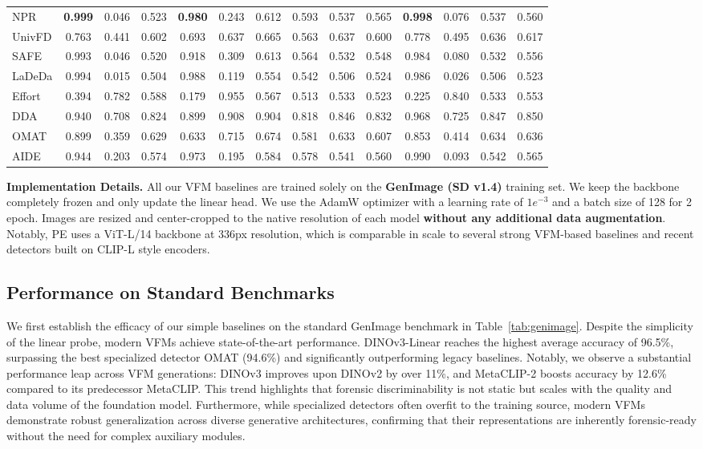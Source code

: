\documentclass[sigconf,screen]{acmart}
\theoremstyle{plain}
\theoremstyle{definition}
\theoremstyle{remark}
\begin{document}
\begin{table}[ht]
{\begin{tabular}{l|ccc|ccc|ccc|ccc|c}
NPR & \textbf{0.999} & 0.046 & 0.523 & \textbf{0.980} & 0.243 & 0.612 & 0.593 & 0.537 & 0.565 & \textbf{0.998} & 0.076 & 0.537 & 0.560 \\
UnivFD & 0.763 & 0.441 & 0.602 & 0.693 & 0.637 & 0.665 & 0.563 & 0.637 & 0.600 & 0.778 & 0.495 & 0.636 & 0.617 \\
SAFE & 0.993 & 0.046 & 0.520 & 0.918 & 0.309 & 0.613 & 0.564 & 0.532 & 0.548 & 0.984 & 0.080 & 0.532 & 0.556 \\
LaDeDa & 0.994 & 0.015 & 0.504 & 0.988 & 0.119 & 0.554 & 0.542 & 0.506 & 0.524 & 0.986 & 0.026 & 0.506 & 0.523 \\
Effort & 0.394 & 0.782 & 0.588 & 0.179 & 0.955 & 0.567 & 0.513 & 0.533 & 0.523 & 0.225 & 0.840 & 0.533 & 0.553 \\
DDA & 0.940 & 0.708 & 0.824 & 0.899 & 0.908 & 0.904 & 0.818 & 0.846 & 0.832 & 0.968 & 0.725 & 0.847 & 0.850 \\
OMAT & 0.899 & 0.359 & 0.629 & 0.633 & 0.715 & 0.674 & 0.581 & 0.633 & 0.607 & 0.853 & 0.414 & 0.634 & 0.636 \\
AIDE & 0.944 & 0.203 & 0.574 & 0.973 & 0.195 & 0.584 & 0.578 & 0.541 & 0.560 & 0.990 & 0.093 & 0.542 & 0.565 \\
\bottomrule
\end{tabular}
}
\label{tab:inthewild}
\end{table}

\textbf{Implementation Details.} 
All our VFM baselines are trained solely on the \textbf{GenImage (SD v1.4)} training set. We keep the backbone completely frozen and only update the linear head. We use the AdamW optimizer with a learning rate of $1e^{-3}$ and a batch size of 128 for 2 epoch. Images are resized and center-cropped to the native resolution of each model \textbf{without any additional data augmentation}. Notably, PE uses a ViT-L/14 backbone at 336px resolution, which is comparable in scale to several strong VFM-based baselines and recent detectors built on CLIP-L style encoders.


\subsection{Performance on Standard Benchmarks}
We first establish the efficacy of our simple baselines on the standard GenImage benchmark in Table~\ref{tab:genimage}. Despite the simplicity of the linear probe, modern VFMs achieve state-of-the-art performance. DINOv3-Linear reaches the highest average accuracy of 96.5\%, surpassing the best specialized detector OMAT (94.6\%) and significantly outperforming legacy baselines. Notably, we observe a substantial performance leap across VFM generations: DINOv3 improves upon DINOv2 by over 11\%, and MetaCLIP-2 boosts accuracy by 12.6\% compared to its predecessor MetaCLIP. This trend highlights that forensic discriminability is not static but scales with the quality and data volume of the foundation model. Furthermore, while specialized detectors often overfit to the training source, modern VFMs demonstrate robust generalization across diverse generative architectures, confirming that their representations are inherently forensic-ready without the need for complex auxiliary modules.
\end{document}
